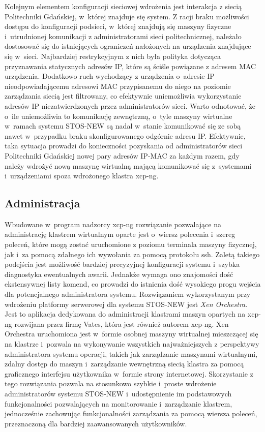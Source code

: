 \noindent Kolejnym elementem konfiguracji sieciowej wdrożenia jest interakcja z siecią Politechniki Gdańskiej, w~której znajduje się system. Z racji braku możliwości dostępu do konfiguracji podsieci, w~której znajdują się maszyny fizyczne i~utrudnionej komunikacji z administratorami sieci politechnicznej, należało dostosować się do istniejących ograniczeń nałożonych na urządzenia znajdujące się w~sieci. Najbardziej restrykcyjnym z nich była polityka dotycząca przyznawania statycznych adresów IP, które są ściśle powiązane z adresem MAC urządzenia. Dodatkowo ruch wychodzący z urządzenia o~adresie IP nieodpowiadającemu adresowi MAC przypisanemu do niego na poziomie zarządzania siecią jest filtrowany, co efektywnie uniemożliwia wykorzystanie adresów IP niezatwierdzonych przez administratorów sieci. Warto odnotować, że o~ile uniemożliwia to komunikację zewnętrzną, o~tyle maszyny wirtualne w~ramach systemu STOS-NEW są nadal w~stanie komunikować się ze sobą nawet w~przypadku braku skonfigurowanego odgórnie adresu IP. Efektywnie, taka sytuacja prowadzi do konieczności pozyskania od administratorów sieci Politechniki Gdańskiej nowej pary adresów IP-MAC za każdym razem, gdy należy wdrożyć nową maszynę wirtualną mającą komunikować się z~systemami i~urządzeniami spoza wdrożonego klastra xcp-ng.
\subsection{Administracja}
Wbudowane w~program nadzorcy xcp-ng rozwiązanie pozwalające na administrację klastrem wirtualnym oparte jest o~wiersz polecenia i~szereg poleceń, które mogą zostać uruchomione z poziomu terminala maszyny fizycznej, jak i~za pomocą zdalnego ich wywołania za pomocą protokołu ssh. Zaletą takiego podejścia jest możliwość bardziej precyzyjnej konfiguracji systemu i~szybka diagnostyka ewentualnych awarii. Jednakże wymaga ono znajomości dość ekstensywnej listy komend, co prowadzi do istnienia dość wysokiego progu wejścia dla potencjalnego administratora systemu. 
\noindent Rozwiązaniem wykorzystanym przy wdrożeniu platformy serwerowej dla systemu STOS-NEW jest \textit{Xen Orchestra}. Jest to aplikacja dedykowana do administracji klastrami maszyn opartych na xcp-ng rozwijana przez firmę Vates, która jest również autorem xcp-ng. Xen Orchestra uruchomiona jest w~formie osobnej maszyny wirtualnej mieszczącej się na klastrze i~pozwala na wykonywanie wszystkich najważniejszych z perspektywy administratora systemu operacji, takich jak zarządzanie maszynami wirtualnymi, zdalny dostęp do maszyn i~zarządzanie wewnętrzną siecią klastra za pomocą graficznego interfejsu użytkownika w~formie strony internetowej\cite{xoa}. Skorzystanie z tego rozwiązania pozwala na stosunkowo szybkie i~proste wdrożenie administratorów systemu STOS-NEW i~udostępnienie im podstawowych funkcjonalności pozwalających na monitorowanie i~zarządzanie klastrem, jednocześnie zachowując funkcjonalności zarządzania za pomocą wiersza poleceń, przeznaczoną dla bardziej zaawansowanych użytkowników.
